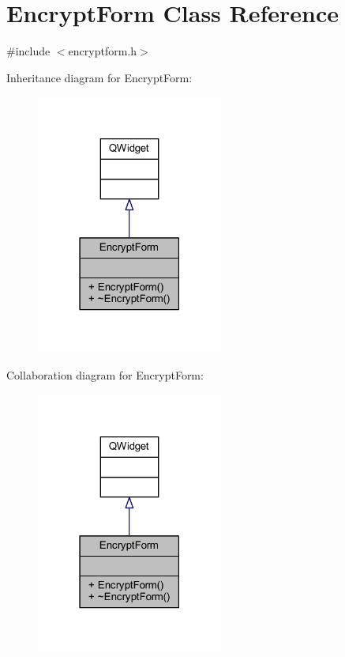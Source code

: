 \hypertarget{class_encrypt_form}{}\section{Encrypt\+Form Class Reference}
\label{class_encrypt_form}


{\ttfamily \#include $<$encryptform.\+h$>$}



Inheritance diagram for Encrypt\+Form\+:\nopagebreak
\begin{figure}[H]
\begin{center}
\leavevmode
\includegraphics[width=174pt]{class_encrypt_form__inherit__graph}
\end{center}
\end{figure}


Collaboration diagram for Encrypt\+Form\+:\nopagebreak
\begin{figure}[H]
\begin{center}
\leavevmode
\includegraphics[width=174pt]{class_encrypt_form__coll__graph}
\end{center}
\end{figure}
